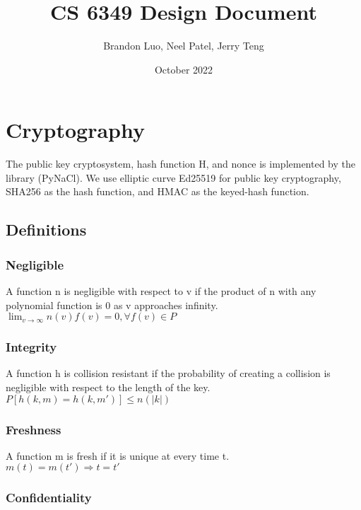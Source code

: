 \documentclass{article}
\title{CS 6349 Design Document}
\author{Brandon Luo, Neel Patel, Jerry Teng}
\date{October 2022}
\begin{document}
\maketitle

\setlength\parindent{0pt}

\section{Cryptography}
 The public key cryptosystem, hash function H, and nonce is implemented by the library (PyNaCl). We use elliptic curve Ed25519 for public key cryptography, SHA256 as the hash function, and HMAC as the keyed-hash function.
 
\subsection{Definitions}

\subsubsection{Negligible}

A function n is negligible with respect to v if the product of n with any polynomial function is 0 as v approaches infinity. \\

$\lim_{v \to \infty} n(v)f(v) = 0, \forall f(v) \in P$

\subsubsection{Integrity}

A function h is collision resistant if the probability of creating a collision is negligible with respect to the length of the key. \\

$P[h(k, m) = h(k, m')] \le n(|k|)$

\subsubsection{Freshness}

A function m is fresh if it is unique at every time t. \\

$m(t) = m(t') \Rightarrow t = t'$

\subsubsection{Confidentiality}
\end{document}
